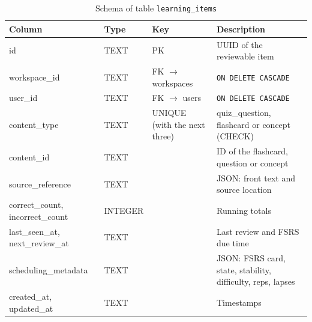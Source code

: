 \begin{table}[htbp]
\centering\small
\caption{Schema of table \texttt{learning\_items}}\label{tab:schema_learning_items}
\begin{tabularx}{\textwidth}{@{}>{\raggedright\arraybackslash}p{} >{\raggedright\arraybackslash}p{} >{\raggedright\arraybackslash}p{} >{\raggedright\arraybackslash}X@{}}
\toprule
\textbf{Column} & \textbf{Type} & \textbf{Key} & \textbf{Description}\\
\midrule
id & TEXT & PK & UUID of the reviewable item\\
workspace\_id & TEXT & FK $\rightarrow$ workspaces & \texttt{ON DELETE CASCADE}\\
user\_id & TEXT & FK $\rightarrow$ users & \texttt{ON DELETE CASCADE}\\
content\_type & TEXT & UNIQUE (with the next three) & quiz\_question, flashcard or concept (CHECK)\\
content\_id & TEXT & & ID of the flashcard, question or concept\\
source\_reference & TEXT & & JSON: front text and source location\\
correct\_count, incorrect\_count & INTEGER & & Running totals\\
last\_seen\_at, next\_review\_at & TEXT & & Last review and FSRS due time\\
scheduling\_metadata & TEXT & & JSON: FSRS card, state, stability, difficulty, reps, lapses\\
created\_at, updated\_at & TEXT & & Timestamps\\
\bottomrule
\end{tabularx}
\end{table}


